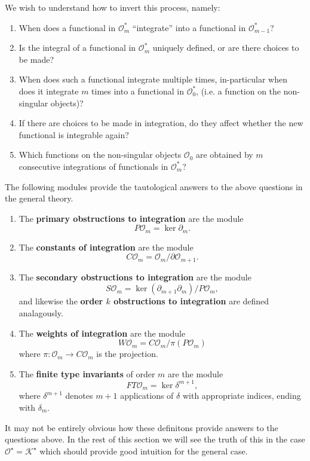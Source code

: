 We wish to understand how to invert this process, namely:
\begin{questions}
	\label{qu:integration-theory}
	\begin{enumerate}
		\item When does a functional in \(\mathcal{O}^{\ast}_{m}\) ``integrate'' into a functional in \(\mathcal{O}^{\ast}_{m - 1}\)?
		\item Is the integral of a functional in \(\mathcal{O}_{m}^{\ast}\) uniquely defined, or are there choices to be made?
		\item When does such a functional integrate multiple times, in-particular when does it integrate \(m\) times into a functional in \(\mathcal{O}^{\ast}_{0}\), (i.e. a function on the non-singular objects)?
		\item If there are choices to be made in integration, do they affect whether the new functional is integrable again?
		\item Which functions on the non-singular objects \(\mathcal{O}_{0}\) are obtained by \(m\) consecutive integrations of functionals in \(\mathcal{O}_{m}^{\ast}\)?
	\end{enumerate}
\end{questions}
The following modules provide the tautological answers to the above questions in the general theory.
\begin{definitions}
	\label{def:integration-theory-modules}
	\begin{enumerate}
		\item The \textbf{primary obstructions to integration} are the module
			\[P\mathcal{O}_{m} = \ker{\partial_{m}}.\]
		\item The \textbf{constants of integration} are the module
			\[C\mathcal{O}_{m} = \mathcal{O}_{m} / \partial \mathcal{O}_{m + 1}.\]
		\item The \textbf{secondary obstructions to integration} are the module
			\[S\mathcal{O}_{m} = \ker{(\partial_{m + 1}\partial_{m})} / P\mathcal{O}_{m},\]
			and likewise the \textbf{order \(k\) obstructions to integration} are defined analagously.
		\item The \textbf{weights of integration} are the module
			\[W\mathcal{O}_{m} = C\mathcal{O}_{m} / \pi(P\mathcal{O}_{m})\]
			where \(\pi: \mathcal{O}_{m} \to C\mathcal{O}_{m}\) is the projection.
		\item The \textbf{finite type invariants} of order \(m\) are the module
			\[FT\mathcal{O}_{m} = \ker \delta^{m + 1},\]
			where \(\delta^{m + 1}\) denotes \(m + 1\) applications of \(\delta\) with appropriate indices, ending with \(\delta_{m}\).

	\end{enumerate}
\end{definitions}
It may not be entirely obvious how these definitons provide answers to the questions above. In the rest of this section we will see the truth of this in the case \(\mathcal{O}^{\star} = \mathcal{K}^{\star}\) which should provide good intuition for the general case.

